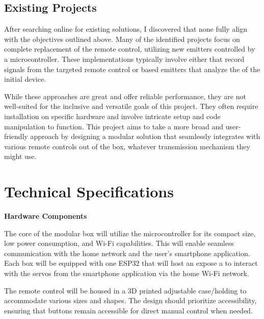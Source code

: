 \subsection{Existing Projects}

After searching online for existing solutions, I discovered that none fully align with the objectives outlined above.
Many of the identified projects focus on complete replacement of the remote control, utilizing new emitters controlled by a microcontroller.
These implementations typically involve either  that record signals from the targeted remote control or  based emitters that analyze the  of the initial device.

While these approaches are great and offer reliable performance, they are not well-suited for the inclusive and versatile goals of this project.
They often require installation on specific hardware and involve intricate setup and code manipulation to function.
This project aims to take a more broad and user-friendly approach by designing a modular solution that seamlessly integrates with various remote controls out of the box, whatever transmission mechanism they might use.

\section{Technical Specifications}

\textbf{Hardware Components}

The core of the modular box will utilize the  microcontroller for its compact size, low power consumption, and Wi-Fi capabilities.
This will enable seamless communication with the home network and the user's smartphone application.
Each box will be equipped with one ESP32 that will host an expose a  to interact with the servos from the smartphone application via the home Wi-Fi network.

The remote control will be housed in a 3D printed adjustable case/holding to accommodate various sizes and shapes.
The design should prioritize accessibility, ensuring that buttons remain accessible for direct manual control when needed.

